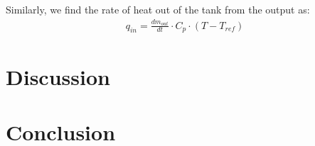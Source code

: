 \documentclass{article}
\begin{document}
Similarly, we find the rate of heat out of the tank from the output as:
\begin{align}
q_{in} = \frac{dm_{out}}{dt} \cdot C_p \cdot (T - T_{ref})
\end{align}



\section{Discussion}







\section{Conclusion}
\end{document}
